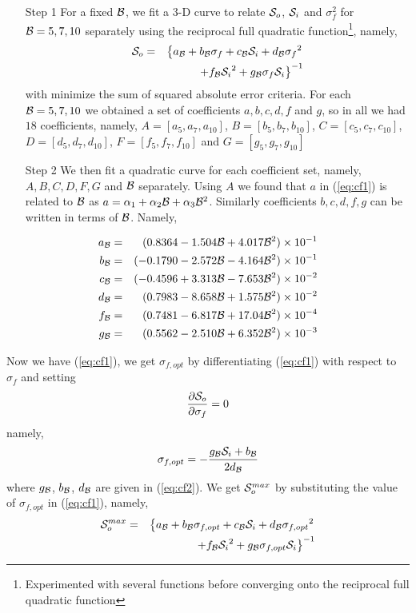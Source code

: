 \documentclass[journal,onecolumn]{IEEEtran}
\newcommand{\g}{f}
\renewcommand{\S}{{\cal S}}
\newcommand{\BW}{{\cal B}}
\renewcommand{\a}{\alpha}
\begin{document}
\begin{enumerate}
 \item[Step 1] For a fixed $\BW$,  we fit a 3-D curve to relate $\S_o$, 
$\S_i$ 
and $\sigma_\g^2$ for  $\BW = 5, 7, 10$ separately
using the reciprocal full quadratic function\footnote{Experimented with
several functions before converging onto the reciprocal full quadratic function}, namely, 
\begin{eqnarray}
\S_o &= & \left \{ a_\BW+b_\BW \sigma_\g + c_\BW \S_i+ d_\BW {\sigma_\g}^2
\right .  \nonumber \\
&& \left . +f_\BW {\S_i}^2+g_\BW \sigma_\g \S_i \right \}^{-1}
\label{eq:cf1}
 \end{eqnarray}
with minimize
the sum of squared absolute error criteria. 
For each $\BW = 5, 7, 10$ we obtained a set of coefficients 
$a, b, c, d, f$ and $g$, so in all we had $18$ coefficients, namely, 
$A = [a_5, a_7, a_{10}]$,
$B = [b_5, b_7, b_{10}]$,
$C = [c_5, c_7, c_{10}]$,
$D = [d_5, d_7, d_{10}]$,
$F = [f_5, f_7, f_{10}]$ and
$G = [g_5, g_7, g_{10}]$

\item [Step 2] We then fit a quadratic curve 
for each coefficient set, namely, $A, B, C, D, F, G$  and $\BW$ separately.
Using $A$ we found that $a$ in (\ref{eq:cf1}) is related to $\BW$ as 
$a=\a_1 + \a_2 \BW+ \a_3{\BW}^2$. 
Similarly coefficients
$b, c, d, f, g$ can be written in terms of $\BW$. Namely, 
 \end{enumerate}
\begin{eqnarray}
a_\BW &=& (0.8364  -1.504 \BW + 4.017 \BW^2) \times {10}^{-1} \nonumber \\
b_\BW &=& (-0.1790  -2.572 \BW -4.164 \BW^2) \times {10}^{-1} \nonumber \\
c_\BW &=& (-0.4596 + 3.313 \BW -7.653 \BW^2)\times {10}^{-2} \nonumber \\
d_\BW &=& (0.7983 - 8.658 \BW + 1.575  \BW^2) \times {10}^{-2} \nonumber \\
f_\BW &=& (0.7481 -6.817 \BW + 17.04 \BW^2)\times {10}^{-4} \nonumber \\
g_\BW &=& (0.5562 - 2.510 \BW +  6.352 \BW^2) \times {10}^{-3} \nonumber \\
\label{eq:cf2}
\end{eqnarray}

 Now we have (\ref{eq:cf1}), we get $\sigma_{\g,opt}$ by 
differentiating (\ref{eq:cf1}) with
respect to
$\sigma_\g$ and setting \[ \frac{\partial \S_o}{\partial\sigma_\g} = 0 \]
namely, 
\begin{equation}
\sigma_{\g,opt}=-\frac{g_\BW \S_i+b_\BW}{2d_\BW}
\label{eq:sopt}
\end{equation}
where $g_\BW$, $b_\BW$, $d_\BW$ are given in (\ref{eq:cf2}). We get
$\S_o^{max}$ by substituting the value of $\sigma_{\g,opt}$ in
(\ref{eq:cf1}), namely,
\begin{eqnarray}
\S_o^{max}&=&\left \{ a_\BW +b_\BW \sigma_{\g,opt} + c_\BW \S_i+ d_\BW 
{\sigma_{\g,opt}}^2
\right .
\nonumber \\ 
&&\left . 
+f_\BW {\S_i}^2+g_\BW \sigma_{\g,opt} \S_i \right \}^{-1}
\label{eq:ssnr}
\end{eqnarray}
\end{document}
